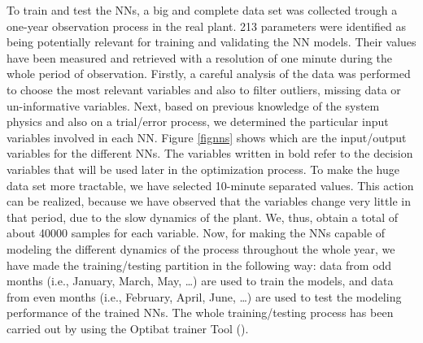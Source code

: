 To train and test the NNs, a big and complete data set was collected trough a one-year observation process in the real plant.  213 parameters were identified as being potentially relevant for training and validating the NN models. Their values have been measured and retrieved with a resolution of one minute during the whole period of observation. Firstly, a careful analysis of the data was performed to choose the most relevant variables and also to filter outliers, missing data or un-informative variables. Next, based on previous knowledge of the system physics and also on a trial/error process, we determined the particular input variables involved in each NN. Figure \ref{fignns} shows which are the input/output variables for the different NNs. The variables written in bold refer to the decision variables that will be used later in the optimization process. To make the huge data set more tractable, we have selected 10-minute separated values. This action can be realized, because we have observed that the variables change very little in that period, due to the slow dynamics of the plant. We, thus, obtain a total of about \num{40000} samples for each variable. Now, for making the NNs capable of modeling the different dynamics of the process throughout the whole year, we have made the training/testing partition in the following way: data from odd months (i.e., January, March, May, \dots) are used to train the models, and data from even months (i.e., February, April, June, \dots) are used to test the modeling performance of the trained NNs. The whole training/testing process has been carried out by using the Optibat trainer Tool (\cite{Optibat}).

